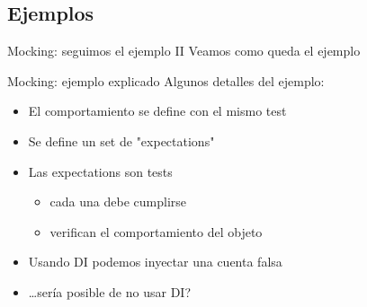 \subsection{Ejemplos}

\begin{frame}{Mocking: seguimos el ejemplo II}
	Veamos como queda el ejemplo
	
\end{frame}

\begin{frame}{Mocking: ejemplo explicado}
Algunos detalles del ejemplo:

\begin{itemize}
	\item El comportamiento se define con el mismo test
	\item Se define un set de "expectations"
	\item Las expectations son tests \\
		\begin{itemize}
			\item cada una debe cumplirse
			\item verifican el comportamiento del objeto
		\end{itemize}
	\item Usando DI podemos inyectar una cuenta falsa
	\item \ldots ser\'ia posible de no usar DI?
\end{itemize}
\end{frame}

